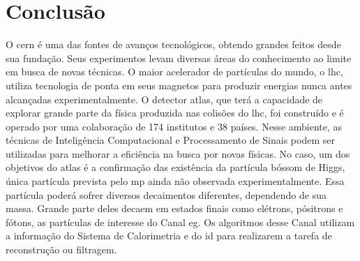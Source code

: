\chapter{Conclusão}

O \gls{cern} é uma das fontes de avanços tecnológicos, obtendo grandes feitos
desde sua fundação. Seus experimentos levam diversas áreas do conhecimento ao limite em busca de novas técnicas.
O maior acelerador de partículas do mundo, o \gls{lhc}, utiliza
tecnologia de ponta em seus magnetos para produzir energias nunca antes
alcançadas experimentalmente. O detector \gls{atlas}, que terá a
capacidade de explorar grande parte da física produzida nas colisões do
\gls{lhc}, foi construído e é operado por uma colaboração de 174 institutos e 38 
países. Nesse ambiente, as técnicas de Inteligência Computacional e Processamento 
de Sinais podem ser utilizadas para melhorar a eficiência na busca por novas
físicas.
No caso, um dos objetivos do \gls{atlas} é a
confirmação das existência da partícula bóssom de Higgs, única partícula
prevista pelo \gls{mp} ainda não observada experimentalmente. Essa partícula
poderá sofrer diversos decaimentos diferentes, dependendo de sua massa. Grande
parte deles decaem em estados finais como elétrons, pósitrons e fótons, as
partículas de interesse do Canal \gls{eg}. 
Os algoritmos desse Canal utilizam a informação do Sistema de Calorimetria e do
\acrlong{id} para realizarem a tarefa de reconstrução ou filtragem.

